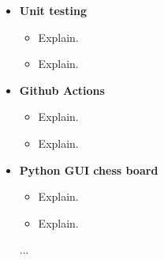 \begin{itemize}
    \item \textbf{Unit testing}
    \begin{itemize}
        \item Explain.
        \item Explain.
    \end{itemize}
    
    \item \textbf{Github Actions}
    \begin{itemize}
        \item Explain.
        \item Explain.
    \end{itemize}

    \item \textbf{Python GUI chess board}
    \begin{itemize}
        \item Explain.
        \item Explain.
    \end{itemize}

    ...
\end{itemize}
